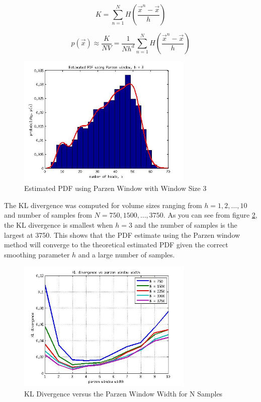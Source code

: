 \documentclass[journal]{IEEEtran}
\begin{document}
\begin{equation}
\label{eq:kernelsum}
K = \sum_{n=1}^{N}{H\left(\frac{\vec{x}^{n}-\vec{x}}{h}\right)}
\end{equation}

\begin{equation}
\label{eq:parzen_est}
p(\vec{x}) \approx \frac{K}{N V} = \frac{1}{N h^d}\sum_{n=1}^{N}{H\left(\frac{\vec{x}^n-\vec{x}}{h}\right)}
\end{equation}

\begin{figure}[h]
\centering
\includegraphics[width=3.3in]{../images/PDF_Parzen.jpg}
\caption{Estimated PDF using Parzen Window with Window Size 3}
\label{fig:PDF_Parzen}
\end{figure}

\par The KL divergence was computed for volume sizes ranging from \(h = 1, 2, \ldots, 10\) and number of samples from \(N = 750, 1500,\ldots, 3750\). As you can see from figure \ref{fig:KL_Parzen}, the KL divergence is smallest when \(h = 3\) and the number of samples is the largest at 3750. This shows that the PDF estimate using the Parzen window method will converge to the theoretical estimated PDF given the correct smoothing parameter \(h\) and a large number of samples.

\begin{figure}[h]
\centering
\includegraphics[width=3.3in]{../images/KL_Parzen.jpg}
\caption{KL Divergence versus the Parzen Window Width for N Samples}
\label{fig:KL_Parzen}
\end{figure}
\end{document}
